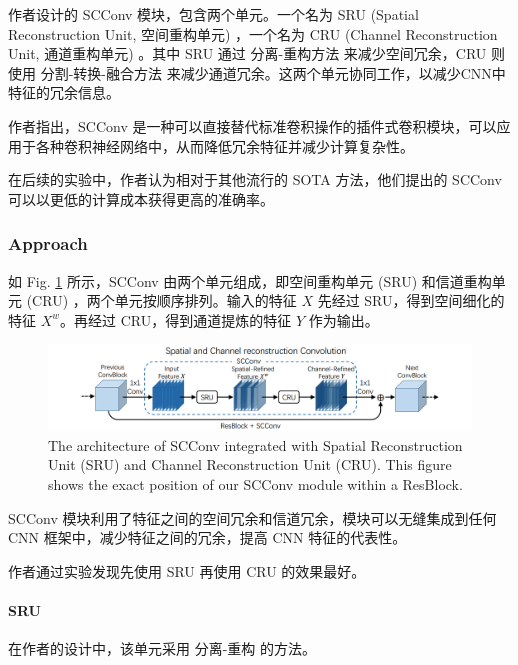 \documentclass[a4paper, 10pt]{article}
\begin{document}
		作者设计的 SCConv 模块，包含两个单元。一个名为 SRU (Spatial Reconstruction Unit, 空间重构单元) ，一个名为 CRU (Channel Reconstruction Unit, 通道重构单元) 。其中 SRU 通过 分离-重构方法 来减少空间冗余，CRU 则使用 分割-转换-融合方法 来减少通道冗余。这两个单元协同工作，以减少CNN中特征的冗余信息。
		
		作者指出，SCConv 是一种可以直接替代标准卷积操作的插件式卷积模块，可以应用于各种卷积神经网络中，从而降低冗余特征并减少计算复杂性。
		
		在后续的实验中，作者认为相对于其他流行的 SOTA 方法，他们提出的 SCConv 可以以更低的计算成本获得更高的准确率。
		
		\subsubsection{Approach}
		
		如 Fig. \ref{fig: SCConv} 所示，SCConv 由两个单元组成，即空间重构单元 (SRU) 和信道重构单元 (CRU) ，两个单元按顺序排列。输入的特征 $X$ 先经过 SRU，得到空间细化的特征 $X^{w}$。再经过 CRU，得到通道提炼的特征 $Y$ 作为输出。
		
		\begin{figure}[htbp]
			\centering 
			\includegraphics[width=\columnwidth]{picture/LLIE/SCConv/SCConv}
			\caption{
				\label{fig: SCConv} 
				The architecture of SCConv integrated with Spatial Reconstruction Unit (SRU) and Channel Reconstruction Unit (CRU). This figure shows the exact position of our SCConv module within a ResBlock.
			}
		\end{figure}
		
		SCConv 模块利用了特征之间的空间冗余和信道冗余，模块可以无缝集成到任何 CNN 框架中，减少特征之间的冗余，提高 CNN 特征的代表性。
		
		作者通过实验发现先使用 SRU 再使用 CRU 的效果最好。
		
		\paragraph{SRU}
		
		在作者的设计中，该单元采用 分离-重构 的方法。
		
\end{document}
